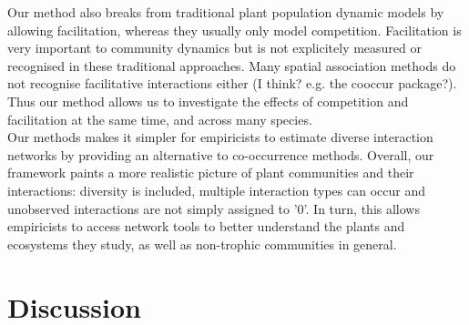 \documentclass[a4,12pt]{article}
\begin{document}
    Our method also breaks from traditional plant population dynamic models by allowing facilitation, whereas they usually only model competition. Facilitation is very important to community dynamics but is not explicitely measured or recognised in these traditional approaches. Many spatial association methods do not recognise facilitative interactions either (I think? e.g. the cooccur package?). Thus our method allows us to investigate the effects of competition and facilitation at the same time, and across many species. \\

    Our methods makes it simpler for empiricists to estimate diverse interaction networks by providing an alternative to co-occurrence methods. Overall, our framework paints a more realistic picture of plant communities and their interactions: diversity is included, multiple interaction types can occur and unobserved interactions are not simply assigned to '0'. In turn, this allows empiricists to access network tools to better understand the plants and ecosystems they study, as well as non-trophic communities in general.\\









\section{Discussion}
\end{document}
